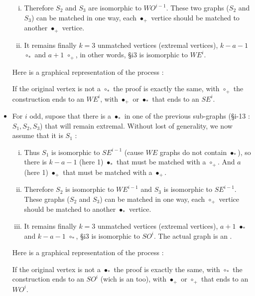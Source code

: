 \documentclass[10pt,a4paper,notitlepage]{article}
\begin{document}
\begin{itemize}
\begin{enumerate}[i)]
\item Therefore $S_{2}$ and $S_{3}$ are isomorphic to $WO^{i-1}$.
These two graphs ($S_{2}$ and $S_{3}$) can be matched in one way, each $\bullet_{+}$ vertice should be matched to another $\bullet_{+}$ vertice.

\item It remains finally $k = 3$ unmatched vertices (extremal vertices), $k-a-1$ $\circ_{*}$ and $a+1$ $\circ_{+}$, in other words, \S{i}{3} is isomorphic to $WE^{i}$. 
\end{enumerate}

Here is a graphical representation of the process :


If the original vertex is not a $\circ_{*}$ the proof is exactly the same, 
with $\circ_{+}$ the construction ends to an $WE^{i}$, 
with $\bullet_{+}$ or $\bullet_{*}$ that ends to an $SE^{i}$.

%
%
\item For $i$ odd, supose that there is a $\bullet_{*}$ in one of the previous sub-graphs (\S{i-1}{3} : $S_{1},S_{2},S_{3}$) that will remain extremal. Without lost of generality, we now assume that it is $S_{1}$ :
\begin{enumerate}[i)]
\item Thus $S_{1}$ is isomorphic to $SE^{i-1}$ (cause $WE$ graphs do not contain $\bullet_{*}$), 
so there is $k-a-1$ (here 1) $\bullet_{*}$ that must be matched with a $\circ_{+}$. And $a$ (here 1) $\bullet_{+}$ that must be matched with a $\bullet_{+}$.

\item Therefore $S_{2}$ is isomorphic to $WE^{i-1}$ and $S_{3}$ is isomorphic to $SE^{i-1}$.
These graphs ($S_{2}$ and $S_{3}$) can be matched in one way, each $\circ_{+}$ vertice should be matched to another $\bullet_{*}$ vertice.

\item It remains finally $k = 3$ unmatched vertices (extremal vertices), $a+1$ $\bullet_{*}$ and $k-a-1$ $\circ_{*}$, \S{i}{3} is isomorphic to $SO^{i}$. The actual graph is an . 
\end{enumerate}
Here is a graphical representation of the process :


If the original vertex is not a $\bullet_{*}$ the proof is exactly the same, 
with $\circ_{*}$ the construction ends to an $SO^{i}$ (wich is an  too),
with $\bullet_{+}$ or $\circ_{+}$ that ends to an $WO^{i}$.

\end{itemize}
\end{document}
